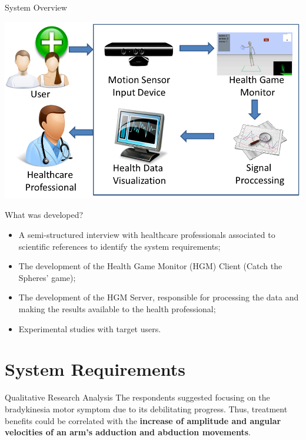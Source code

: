 \documentclass{beamer}
\begin{document}
\begin{frame}
		 \begin{block}{System Overview}
			\begin{center}
				\includegraphics[height=2.2 in]{img/systemoverview3.png}
			\end{center}
		 \end{block}
\end{frame}


\begin{frame}
    \begin{block}{What was developed?}
        \begin{itemize}[<+->]
            \item  A semi-structured interview with healthcare professionals associated to scientific references to identify the system requirements;
            \item The development of the Health Game Monitor (HGM) Client (Catch the Spheres' game);
            \item The development of the HGM Server, responsible for processing the data and making the results available to the health professional;
						\item Experimental studies with target users.
        \end{itemize}
    \end{block}
\end{frame}

\section{System Requirements}


\begin{frame}{} 
    \begin{block}{Qualitative Research Analysis}					
		The respondents suggested focusing on the bradykinesia motor symptom due to its debilitating progress. Thus, treatment benefits could be correlated with the \textbf{increase of amplitude and angular velocities of an arm's adduction and abduction movements}.
    \end{block}
\end{frame} 
\end{document}
